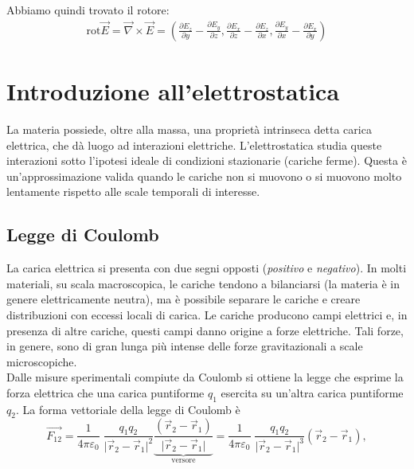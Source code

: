 \documentclass{book}
\begin{document}
Abbiamo quindi trovato il rotore:
\begin{align*}
    \text{rot} \vec{E} = \vec{\nabla} \times \vec{E} = \left( \frac{\partial E_z}{\partial y}-\frac{\partial E_y}{\partial z}, \frac{\partial E_x}{\partial z}- \frac{\partial E_z}{\partial x}, \frac{\partial E_y}{\partial x}- \frac{\partial E_x}{\partial y} \right)
\end{align*}




















\chapter{Introduzione all'elettrostatica}
La materia possiede, oltre alla massa, una proprietà intrinseca detta carica elettrica, che dà luogo ad interazioni elettriche.  
L'elettrostatica studia queste interazioni sotto l'ipotesi ideale di condizioni stazionarie (cariche ferme).
Questa è un'approssimazione valida quando le cariche non si muovono o si muovono molto lentamente rispetto alle scale temporali di interesse.

\section{Legge di Coulomb}
La carica elettrica si presenta con due segni opposti (\emph{positivo} e \emph{negativo}). In molti materiali, su scala macroscopica, le cariche tendono a bilanciarsi (la materia è in genere elettricamente neutra), ma è possibile separare le cariche e creare distribuzioni con eccessi locali di carica. Le cariche producono campi elettrici e, in presenza di altre cariche, questi campi danno origine a forze elettriche. Tali forze, in genere, sono di gran lunga più intense delle forze gravitazionali a scale microscopiche.
\\
Dalle misure sperimentali compiute da Coulomb si ottiene la legge che esprime la forza elettrica che una carica puntiforme \(q_1\) esercita su un'altra carica puntiforme \(q_2\). La forma vettoriale della legge di Coulomb è
\[
\vec{{F}_{12}} 
= \frac{1}{4\pi\varepsilon_0}\;
\frac{q_1 q_2}{ \lvert{\vec{r}_2 - \vec{r}_1 } \rvert ^2} 
\underbrace{\frac{(\vec{r}_2 - \vec{r}_1 )}{\lvert{\vec{r}_2 - \vec{r}_1 } \rvert}}_{\text{versore}} 
= \frac{1}{4\pi\varepsilon_0}\;
\frac{q_1 q_2}{ \lvert{\vec{r}_2 - \vec{r}_1 } \rvert ^3} (\vec{r}_2 - \vec{r}_1 ),
\]
\end{document}
